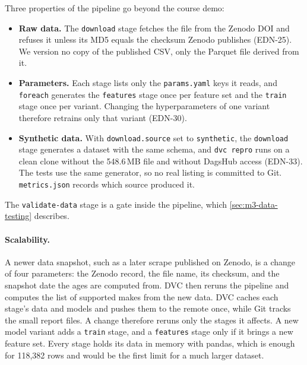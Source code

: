 Three properties of the pipeline go beyond the course demo:

\begin{itemize}
  \item \textbf{Raw data.} The \texttt{download} stage fetches the file from the Zenodo DOI and refuses it unless its MD5 equals the checksum Zenodo publishes (EDN-25). We version no copy of the published CSV, only the Parquet file derived from it.
  \item \textbf{Parameters.} Each stage lists only the \texttt{params.yaml} keys it reads, and \texttt{foreach} generates the \texttt{features} stage once per feature set and the \texttt{train} stage once per variant. Changing the hyperparameters of one variant therefore retrains only that variant (EDN-30).
  \item \textbf{Synthetic data.} With \texttt{download.source} set to \texttt{synthetic}, the \texttt{download} stage generates a dataset with the same schema, and \texttt{dvc repro} runs on a clean clone without the 548.6\,MB file and without DagsHub access (EDN-33). The tests use the same generator, so no real listing is committed to Git. \texttt{metrics.json} records which source produced it.
\end{itemize}

The \texttt{validate-data} stage is a gate inside the pipeline, which \cref{sec:m3-data-testing} describes.

\paragraph{Scalability.}
A newer data snapshot, such as a later scrape published on Zenodo, is a change of four parameters: the Zenodo record, the file name, its checksum, and the snapshot date the ages are computed from.
DVC then reruns the pipeline and computes the list of supported makes from the new data.
DVC caches each stage's data and models and pushes them to the remote once, while Git tracks the small report files.
A change therefore reruns only the stages it affects.
A new model variant adds a \texttt{train} stage, and a \texttt{features} stage only if it brings a new feature set.
Every stage holds its data in memory with pandas, which is enough for 118,382 rows and would be the first limit for a much larger dataset.


